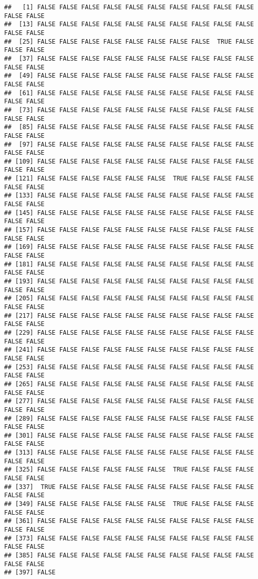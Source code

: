 \documentclass[
]{article}
\newenvironment{Shaded}{\begin{snugshade}}{\end{snugshade}}
\newcommand{\FunctionTok}[1]{\textcolor[rgb]{0.13,0.29,0.53}{\textbf{#1}}}
\newcommand{\NormalTok}[1]{#1}
\newcommand{\SpecialCharTok}[1]{\textcolor[rgb]{0.81,0.36,0.00}{\textbf{#1}}}
\begin{document}
\begin{Shaded}
\end{Shaded}

\begin{verbatim}
##   [1] FALSE FALSE FALSE FALSE FALSE FALSE FALSE FALSE FALSE FALSE FALSE FALSE
##  [13] FALSE FALSE FALSE FALSE FALSE FALSE FALSE FALSE FALSE FALSE FALSE FALSE
##  [25] FALSE FALSE FALSE FALSE FALSE FALSE FALSE FALSE  TRUE FALSE FALSE FALSE
##  [37] FALSE FALSE FALSE FALSE FALSE FALSE FALSE FALSE FALSE FALSE FALSE FALSE
##  [49] FALSE FALSE FALSE FALSE FALSE FALSE FALSE FALSE FALSE FALSE FALSE FALSE
##  [61] FALSE FALSE FALSE FALSE FALSE FALSE FALSE FALSE FALSE FALSE FALSE FALSE
##  [73] FALSE FALSE FALSE FALSE FALSE FALSE FALSE FALSE FALSE FALSE FALSE FALSE
##  [85] FALSE FALSE FALSE FALSE FALSE FALSE FALSE FALSE FALSE FALSE FALSE FALSE
##  [97] FALSE FALSE FALSE FALSE FALSE FALSE FALSE FALSE FALSE FALSE FALSE FALSE
## [109] FALSE FALSE FALSE FALSE FALSE FALSE FALSE FALSE FALSE FALSE FALSE FALSE
## [121] FALSE FALSE FALSE FALSE FALSE FALSE  TRUE FALSE FALSE FALSE FALSE FALSE
## [133] FALSE FALSE FALSE FALSE FALSE FALSE FALSE FALSE FALSE FALSE FALSE FALSE
## [145] FALSE FALSE FALSE FALSE FALSE FALSE FALSE FALSE FALSE FALSE FALSE FALSE
## [157] FALSE FALSE FALSE FALSE FALSE FALSE FALSE FALSE FALSE FALSE FALSE FALSE
## [169] FALSE FALSE FALSE FALSE FALSE FALSE FALSE FALSE FALSE FALSE FALSE FALSE
## [181] FALSE FALSE FALSE FALSE FALSE FALSE FALSE FALSE FALSE FALSE FALSE FALSE
## [193] FALSE FALSE FALSE FALSE FALSE FALSE FALSE FALSE FALSE FALSE FALSE FALSE
## [205] FALSE FALSE FALSE FALSE FALSE FALSE FALSE FALSE FALSE FALSE FALSE FALSE
## [217] FALSE FALSE FALSE FALSE FALSE FALSE FALSE FALSE FALSE FALSE FALSE FALSE
## [229] FALSE FALSE FALSE FALSE FALSE FALSE FALSE FALSE FALSE FALSE FALSE FALSE
## [241] FALSE FALSE FALSE FALSE FALSE FALSE FALSE FALSE FALSE FALSE FALSE FALSE
## [253] FALSE FALSE FALSE FALSE FALSE FALSE FALSE FALSE FALSE FALSE FALSE FALSE
## [265] FALSE FALSE FALSE FALSE FALSE FALSE FALSE FALSE FALSE FALSE FALSE FALSE
## [277] FALSE FALSE FALSE FALSE FALSE FALSE FALSE FALSE FALSE FALSE FALSE FALSE
## [289] FALSE FALSE FALSE FALSE FALSE FALSE FALSE FALSE FALSE FALSE FALSE FALSE
## [301] FALSE FALSE FALSE FALSE FALSE FALSE FALSE FALSE FALSE FALSE FALSE FALSE
## [313] FALSE FALSE FALSE FALSE FALSE FALSE FALSE FALSE FALSE FALSE FALSE FALSE
## [325] FALSE FALSE FALSE FALSE FALSE FALSE  TRUE FALSE FALSE FALSE FALSE FALSE
## [337]  TRUE FALSE FALSE FALSE FALSE FALSE FALSE FALSE FALSE FALSE FALSE FALSE
## [349] FALSE FALSE FALSE FALSE FALSE FALSE  TRUE FALSE FALSE FALSE FALSE FALSE
## [361] FALSE FALSE FALSE FALSE FALSE FALSE FALSE FALSE FALSE FALSE FALSE FALSE
## [373] FALSE FALSE FALSE FALSE FALSE FALSE FALSE FALSE FALSE FALSE FALSE FALSE
## [385] FALSE FALSE FALSE FALSE FALSE FALSE FALSE FALSE FALSE FALSE FALSE FALSE
## [397] FALSE
\end{verbatim}
\end{document}
